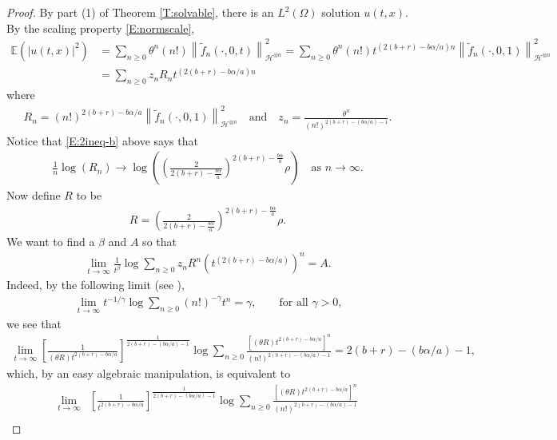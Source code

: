 \documentclass[a4paper,11pt]{article}
\numberwithin{equation}{section}
\numberwithin{equation}{section}
\theoremstyle{plain}
\theoremstyle{definition}
\newcommand{\Norm}[1]{\left\|  #1   \right\|}
\begin{document}
\begin{proof}
  By part (1) of Theorem \ref{T:solvable}, there is an $L^2(\Omega)$ solution $u(t,x)$.  By the
  scaling property \eqref{E:normscale},
  \begin{align*}
    \mathbb{E}(|u(t,x)|^2)
    & = \sum_{n\ge 0}   \theta^n(n!)\Norm{\widetilde{f}_n(\cdot,0,t)}_{\mathcal{H}^{\otimes n}}^2
      = \sum_{n \ge 0}\theta^n(n!)t^{(2(b+r)-b\alpha/a)n}\Norm{\widetilde{f}_n(\cdot,0,1)}_{\mathcal{H}^{\otimes n}}^2 \\
    & = \sum_{n \ge 0} z_n R_nt^{(2(b+r)-b\alpha/a)n}
  \end{align*}
  where
  \begin{align*}
    R_n = (n!)^{2(b+r)-b\alpha/a}\Norm{\widetilde{f}_n(\cdot,0,1)}_{\mathcal{H}^{\otimes n}}^2 \quad \text{and} \quad
    z_n = \frac{\theta^n}{(n!)^{2(b+r)-(b\alpha/a)-1}}.
  \end{align*}
  Notice that \eqref{E:2ineq-b} above says that
  \begin{align*}
    \frac{1}{n}\log(R_n) \to  \log\left( \left(\frac{2}{2(b+r)-\frac{b\alpha}{a}}\right)^{2(b+r)-\frac{b\alpha}{a}}  \rho \right )  \quad \text{as } n\to \infty.
  \end{align*}
  Now define $R$ to be
  \begin{align*}
    R=\left(\frac{2}{2(b+r)-\frac{b\alpha}{a}}\right)^{2(b+r)-\frac{b\alpha}{a}} \rho.
  \end{align*}
  We want to find a $\beta$ and $A$ so that
  \begin{align*}
    \lim_{t \to \infty}\frac{1}{t^\beta} \log \sum_{n \ge 0} z_n R^n \left(t^{(2(b+r)-b\alpha/a)}\right)^n = A.
  \end{align*}
  Indeed, by the following limit (see \cite[Lemma A.3]{BCC21}),
  \begin{align*}
    \lim_{t\to\infty} t^{-1/\gamma}\log\sum_{n\ge 0} (n!)^{-\gamma} t^n = \gamma, \qquad \text{for all $\gamma>0$,}
  \end{align*}
  we see that
  \begin{align*}
    \lim_{t\to \infty} \left[\frac{1}{(\theta
    R)t^{2(b+r)-b\alpha/a}}\right]^{\frac{1}{2(b+r)-(b\alpha/a)-1}} \log \sum_{n \ge 0} \frac{\left[ (\theta R) t^{2(b+r)-b\alpha/a}\right]^n}{(n!)^{2(b+r)-(b\alpha/a)-1}} = 2(b+r) - (b\alpha/a) -1,
  \end{align*}
  which, by an easy algebraic manipulation, is equivalent to
  \begin{align*}
    \lim_{t\to \infty}
    & \left[\frac{1}{t^{2(b+r)-b\alpha/a}}\right]^{\frac{1}{2(b+r)-(b\alpha/a)-1}} \log \sum_{n \ge 0} \frac{\left[ (\theta R) t^{2(b+r)-b\alpha/a}\right]^n}{(n!)^{2(b+r)-(b\alpha/a)-1}} \\

\end{align*}
\end{proof}
\end{document}
